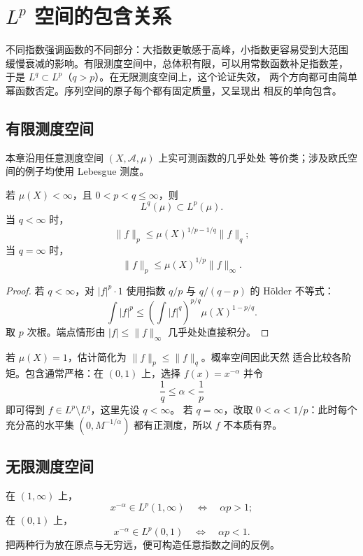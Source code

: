 \chapter{\texorpdfstring{\(L^p\)}{Lp} 空间的包含关系}
\label{chap:lp-inclusions}

不同指数强调函数的不同部分：大指数更敏感于高峰，小指数更容易受到大范围
缓慢衰减的影响。有限测度空间中，总体积有限，可以用常数函数补足指数差，
于是 \(L^q\subset L^p\)（\(q>p\)）。在无限测度空间上，这个论证失效，
两个方向都可由简单幂函数否定。序列空间的原子每个都有固定质量，又呈现出
相反的单向包含。

\section{有限测度空间}

本章沿用任意测度空间 \((X,\mathcal A,\mu)\) 上实可测函数的几乎处处
等价类；涉及欧氏空间的例子均使用 Lebesgue 测度。

\begin{theorem}
\label{thm:finite-measure-lp-inclusion}
若 \(\mu(X)<\infty\)，且 \(0<p<q\le\infty\)，则
\[
 L^q(\mu)\subset L^p(\mu).
\]
当 \(q<\infty\) 时，
\[
 \|f\|_p\le
 \mu(X)^{1/p-1/q}\|f\|_q;
\]
当 \(q=\infty\) 时，
\[
 \|f\|_p\le\mu(X)^{1/p}\|f\|_\infty.
\]
\end{theorem}

\begin{proof}
若 \(q<\infty\)，对 \(|f|^p\cdot1\) 使用指数
\(q/p\) 与 \(q/(q-p)\) 的 Hölder 不等式：
\[
 \int|f|^p
 \le\left(\int|f|^q\right)^{p/q}
 \mu(X)^{1-p/q}.
\]
取 \(p\) 次根。端点情形由 \(|f|\le\|f\|_\infty\) 几乎处处直接积分。
\end{proof}

若 \(\mu(X)=1\)，估计简化为 \(\|f\|_p\le\|f\|_q\)。概率空间因此天然
适合比较各阶矩。包含通常严格：在 \((0,1)\) 上，选择
\(f(x)=x^{-\alpha}\) 并令
\[
 \frac1q\le\alpha<\frac1p
\]
即可得到 \(f\in L^p\setminus L^q\)，这里先设 \(q<\infty\)。
若 \(q=\infty\)，改取 \(0<\alpha<1/p\)：此时每个充分高的水平集
\((0,M^{-1/\alpha})\) 都有正测度，所以 \(f\) 不本质有界。

\section{无限测度空间}

在 \((1,\infty)\) 上，
\[
 x^{-\alpha}\in L^p(1,\infty)
 \quad\Longleftrightarrow\quad \alpha p>1;
\]
在 \((0,1)\) 上，
\[
 x^{-\alpha}\in L^p(0,1)
 \quad\Longleftrightarrow\quad \alpha p<1.
\]
把两种行为放在原点与无穷远，便可构造任意指数之间的反例。

